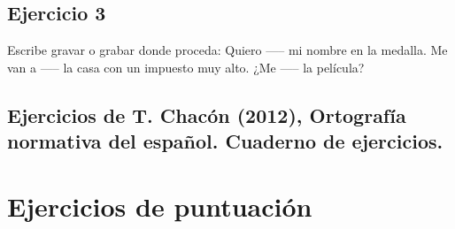 \documentclass[12pt, a4paper, oneside]{report}
\begin{document}
\section{Ejercicio 3}
Escribe gravar o grabar donde
proceda:
Quiero ----- mi nombre en la medalla.
Me van a ----- la casa con un impuesto
muy alto.
¿Me ----- la película?

\section{Ejercicios de T. Chacón (2012), Ortografía
normativa del español. Cuaderno de
ejercicios.}
\clearpage

\chapter*{Ejercicios de puntuación}
\setcounter{chapter}{4}
\setcounter{section}{0}

\section{}
\end{document}
